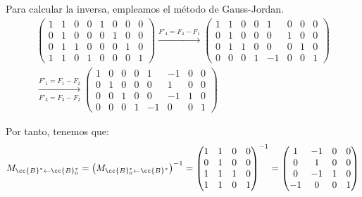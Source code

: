 \documentclass[12pt]{article}
\begin{document}
\begin{ejercicio}
\begin{enumerate}
		Para calcular la inversa, empleamos el método de Gauss-Jordan.
		\begin{multline*}
			\left(\begin{array}{cccc|cccc}
				1 & 1 & 0 & 0 & 1 & 0 & 0 & 0\\
				0 & 1 & 0 & 0 & 0 & 1 & 0 & 0\\
				0 & 1 & 1 & 0 & 0 & 0 & 1 & 0\\
				1 & 1 & 0 & 1 & 0 & 0 & 0 & 1
			\end{array}\right)
			\xrightarrow{F'_4 = F_4-F_1}
			\left(\begin{array}{cccc|cccc}
				1 & 1 & 0 & 0 & 1 & 0 & 0 & 0\\
				0 & 1 & 0 & 0 & 0 & 1 & 0 & 0\\
				0 & 1 & 1 & 0 & 0 & 0 & 1 & 0\\
				0 & 0 & 0 & 1 & -1 & 0 & 0 & 1
			\end{array}\right)
			\\ \xrightarrow[F'_3 = F_3-F_2]{F'_1 = F_1-F_2}
			\left(\begin{array}{cccc|cccc}
				1 & 0 & 0 & 0 & 1 & -1 & 0 & 0\\
				0 & 1 & 0 & 0 & 0 & 1 & 0 & 0\\
				0 & 0 & 1 & 0 & 0 & -1 & 1 & 0\\
				0 & 0 & 0 & 1 & -1 & 0 & 0 & 1
			\end{array}\right)
		\end{multline*}

		Por tanto, tenemos que:
		\begin{align*}
			M_{\cc{B}^*\leftarrow \cc{B}_0^*} = \left(M_{\cc{B}_0^*\leftarrow \cc{B}^*}\right)^{-1}
			= \begin{pmatrix}
				1 & 1 & 0 & 0\\
				0 & 1 & 0 & 0\\
				1 & 1 & 1 & 0\\
				1 & 1 & 0 & 1
			\end{pmatrix}^{-1}
			= \begin{pmatrix}
				1 & -1 & 0 & 0\\
				0 & 1 & 0 & 0\\
				0 & -1 & 1 & 0\\
				-1 & 0 & 0 & 1
			\end{pmatrix}
		\end{align*}
	\end{enumerate}
\end{ejercicio}
\end{document}
